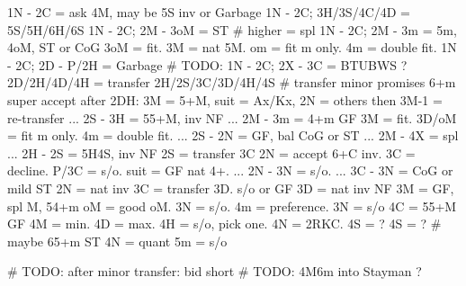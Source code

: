 1N -
2C = ask 4M, may be 5S inv or Garbage
    1N - 2C; 3H/3S/4C/4D = 5S/5H/6H/6S
    1N - 2C; 2M - 3oM = ST  # higher = spl
    1N - 2C; 2M - 3m = 5m, 4oM, ST or CoG
        3oM = fit. 3M = nat 5M. om = fit m only. 4m = double fit.
    1N - 2C; 2D - P/2H = Garbage
    # TODO: 1N - 2C; 2X - 3C = BTUBWS ?
2D/2H/4D/4H = transfer 2H/2S/3C/3D/4H/4S  # transfer minor promises 6+m
    super accept after 2DH: 3M = 5+M, suit = Ax/Kx, 2N = others
        then 3M-1 = re-transfer
    ... 2S - 3H = 55+M, inv NF
    ... 2M - 3m = 4+m GF
        3M = fit. 3D/oM = fit m only. 4m = double fit.
    ... 2S - 2N = GF, bal CoG or ST
    ... 2M - 4X = spl
    ... 2H - 2S = 5H4S, inv NF
2S = transfer 3C
    2N = accept 6+C inv. 3C = decline.
        P/3C = s/o. suit = GF nat 4+.
        ... 2N - 3N = s/o. ... 3C - 3N = CoG or mild ST
2N = nat inv
3C = transfer 3D. s/o or GF
3D = nat inv NF
3M = GF, spl M, 54+m
    oM = good oM. 3N = s/o. 4m = preference.
3N = s/o
4C = 55+M GF
    4M = min.
    4D = max.
        4H = s/o, pick one. 4N = 2RKC. 4S = ?
4S = ?  # maybe 65+m ST
4N = quant
5m = s/o

# TODO: after minor transfer: bid short
# TODO: 4M6m into Stayman ?